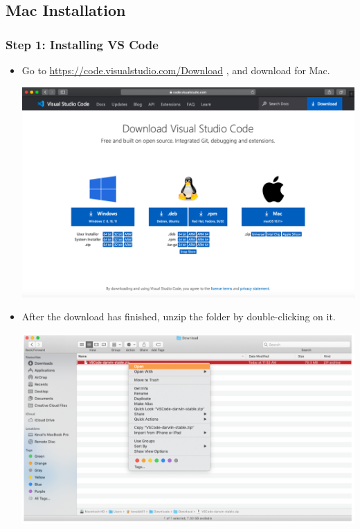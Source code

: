 \subsection{Mac Installation}

\subsubsection{Step 1: Installing VS Code}

\begin{itemize}
    \item Go to \textcolor{cyan}{\href{VS code download page}{https://code.visualstudio.com/Download}} , and download for Mac. 

    \includegraphics[width=6in]{images/macVSCodeSetup/image3.png}

    \item After the download has finished, unzip the folder by double-clicking on it.

    \includegraphics[width=6in]{images/macVSCodeSetup/image5.png}


\end{itemize}
